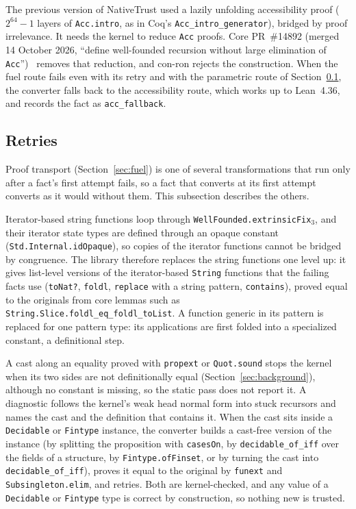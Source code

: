 \documentclass[11pt]{article}
\begin{document}
The previous version of NativeTrust used a lazily unfolding accessibility proof (\(2^{64}-1\)
layers of \texttt{Acc.intro}, as in Coq's \texttt{Acc\_intro\_generator}), bridged by proof
irrelevance. It needs the kernel to reduce \texttt{Acc} proofs. Core PR~\#14892 (merged
14 October 2026, ``define well-founded recursion without large elimination of
\texttt{Acc}'')~\cite{pr14892} removes that reduction, and con-ron rejects the construction. When
the fuel route fails even with its retry and with the parametric route of Section~\ref{sec:retries}, the
converter falls back to the accessibility route, which works up to Lean~4.36, and records the fact as
\texttt{acc\_fallback}.

\subsection{Retries}\label{sec:retries}
Proof transport (Section~\ref{sec:fuel}) is one of several transformations that run only after a fact's first
attempt fails, so a fact that converts at its first attempt converts as it would without them. This
subsection describes the others.

Iterator-based string functions loop through \texttt{WellFounded.extrinsicFix\(_3\)}, and their iterator state
types are defined through an opaque constant (\texttt{Std.Internal.idOpaque}), so copies of the iterator
functions cannot be bridged by congruence. The library therefore replaces the string functions one level up:
it gives list-level versions of the iterator-based \texttt{String} functions that the failing facts use
(\texttt{toNat?}, \texttt{foldl}, \texttt{replace} with a string pattern, \texttt{contains}), proved equal
to the originals from core lemmas such as \texttt{String.Slice.foldl\_eq\_foldl\_toList}. A function generic in
its pattern is replaced for one pattern type: its applications are first folded into a specialized constant,
a definitional step.

A cast along an equality proved with \texttt{propext} or \texttt{Quot.sound} stops the kernel when its two
sides are not definitionally equal (Section~\ref{sec:background}), although no constant is missing, so the
static pass does not report it. A diagnostic follows the kernel's weak head normal
form into stuck recursors and names the cast and the definition that contains it. When the cast sits inside a
\texttt{Decidable} or \texttt{Fintype} instance, the converter builds a cast-free version of the instance (by
splitting the proposition with \texttt{casesOn}, by \texttt{decidable\_of\_iff} over the fields of a
structure, by \texttt{Fintype.ofFinset}, or by turning the cast into \texttt{decidable\_of\_iff}), proves it
equal to the original by \texttt{funext} and \texttt{Subsingleton.elim}, and retries. Both are kernel-checked,
and any value of a \texttt{Decidable} or \texttt{Fintype} type is correct by construction, so nothing new is
trusted.
\end{document}
